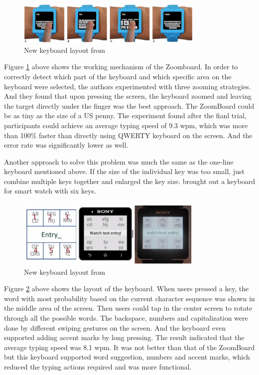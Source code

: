 \documentclass[11pt]{article}
\begin{document}
\begin{figure}[H]
  \centering
  \includegraphics[width=0.8\textwidth]{ZoomBoard.png}
  \caption{New keyboard layout from \citep{10.1145/2470654.2481387}}
  \label{fig:zoomboard}
\end{figure}

Figure \ref{fig:zoomboard} above shows the working mechanism of the Zoomboard. In order to correctly detect which part of the keyboard and which specific area on the keyboard were selected, the authors  experimented with three zooming strategies. And they found that upon pressing the screen, the keyboard zoomed and leaving the target directly under the finger was the best approach. The ZoomBoard could be as tiny as the size of a US penny. The experiment found after the fianl trial, participants could achieve an average typing speed of 9.3 wpm, which was more than 100\% faster than directly using QWERTY keyboard on the screen. And the error rate was significantly lower as well.

Another approach to solve this problem was much the same as the one-line keyboard \citep{10.1145/2047196.2047257} mentioned above. If the size of the individual key was too small, just combine multiple keys together and enlarged the key size. \citet{6926662} brought out a keyboard for smart watch with six keys.

\begin{figure}[H]
  \centering
  \includegraphics[width=0.8\textwidth]{Watch2014T9.png}
  \caption{New keyboard layout from \citep{6926662}}
  \label{fig:watch2014t9}
\end{figure}

Figure \ref{fig:watch2014t9} above shows the layout of the keyboard. When users pressed a key, the word with most probability based on the current character sequence was shown in the middle area of the screen. Then users could tap in the center screen to rotate through all the possible words. The backspace, numbers and capitalization were done by different swiping gestures on the screen. And the keyboard even supported adding accent marks by long pressing. The result indicated that the average typing speed was 8.1 wpm. It was not better than that of the ZoomBoard but this keyboard supported word suggestion, numbers and accent marks, which reduced the typing actions required and was more functional.
\end{document}
